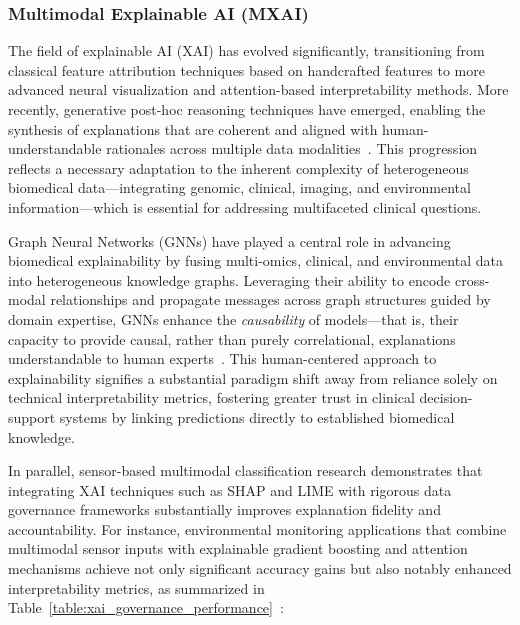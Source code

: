 \documentclass[sigconf]{acmart}
\begin{document}
\subsubsection{Multimodal Explainable AI (MXAI)}

The field of explainable AI (XAI) has evolved significantly, transitioning from classical feature attribution techniques based on handcrafted features to more advanced neural visualization and attention-based interpretability methods. More recently, generative post-hoc reasoning techniques have emerged, enabling the synthesis of explanations that are coherent and aligned with human-understandable rationales across multiple data modalities~\cite{ref13,ref24,ref25}. This progression reflects a necessary adaptation to the inherent complexity of heterogeneous biomedical data—integrating genomic, clinical, imaging, and environmental information—which is essential for addressing multifaceted clinical questions.

Graph Neural Networks (GNNs) have played a central role in advancing biomedical explainability by fusing multi-omics, clinical, and environmental data into heterogeneous knowledge graphs. Leveraging their ability to encode cross-modal relationships and propagate messages across graph structures guided by domain expertise, GNNs enhance the \textit{causability} of models—that is, their capacity to provide causal, rather than purely correlational, explanations understandable to human experts~\cite{ref24}. This human-centered approach to explainability signifies a substantial paradigm shift away from reliance solely on technical interpretability metrics, fostering greater trust in clinical decision-support systems by linking predictions directly to established biomedical knowledge.

In parallel, sensor-based multimodal classification research demonstrates that integrating XAI techniques such as SHAP and LIME with rigorous data governance frameworks substantially improves explanation fidelity and accountability. For instance, environmental monitoring applications that combine multimodal sensor inputs with explainable gradient boosting and attention mechanisms achieve not only significant accuracy gains but also notably enhanced interpretability metrics, as summarized in Table~\ref{table:xai_governance_performance}~\cite{ref25}:
\end{document}
